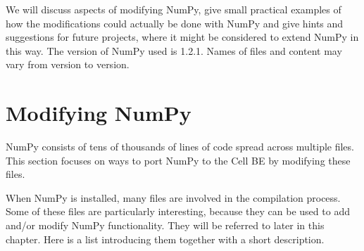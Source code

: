 We will discuss aspects of modifying NumPy, give small practical examples of how the modifications could
actually be done with NumPy and give hints and suggestions for future projects, where it might be considered to
extend NumPy in this way. The version of NumPy used is 1.2.1. Names of files and content may vary from version to version.



\section{Modifying NumPy}
\label{sec:extending_numpy}
NumPy consists of tens of thousands of lines of code spread across
multiple files. This section focuses on ways to port NumPy to the Cell
BE by modifying these files.

When NumPy is installed, many files are involved in the compilation
process. Some of these files are particularly interesting, because
they can be used to add and/or modify NumPy functionality. They will
be referred to later in this chapter. Here is a list introducing
them together with a short description.

